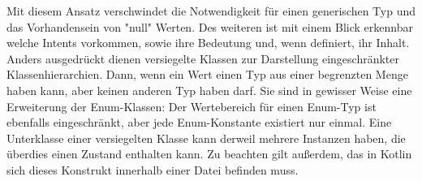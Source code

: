\bigskip
Mit diesem Ansatz verschwindet die Notwendigkeit für einen generischen Typ und das Vorhandensein von 
"null" Werten. Des weiteren ist mit einem Blick erkennbar welche Intents vorkommen, sowie ihre Bedeutung 
und, wenn definiert, ihr Inhalt. Anders ausgedrückt dienen versiegelte Klassen zur Darstellung 
eingeschränkter Klassenhierarchien. Dann, wenn ein Wert einen Typ aus einer begrenzten Menge haben kann, 
aber keinen anderen Typ haben darf. Sie sind in gewisser Weise eine Erweiterung der Enum-Klassen: Der 
Wertebereich für einen Enum-Typ ist ebenfalls eingeschränkt, aber jede Enum-Konstante existiert nur 
einmal. Eine Unterklasse einer versiegelten Klasse kann derweil mehrere Instanzen haben, die überdies 
einen Zustand enthalten kann.
Zu beachten gilt außerdem, das in Kotlin sich dieses Konstrukt innerhalb einer Datei befinden muss.
\\

